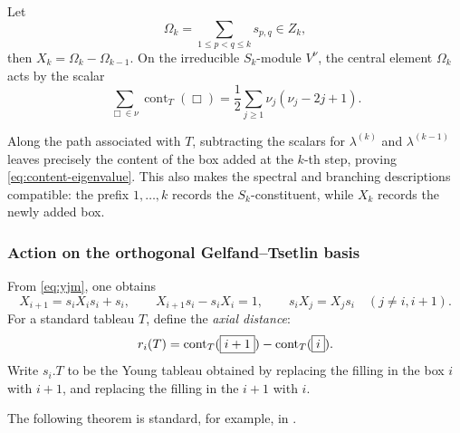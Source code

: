 \documentclass[11pt]{amsart}
\numberwithin{equation}{section}
\theoremstyle{definition}
\newcommand{\cont}{{\operatorname{cont}}}
\begin{document}
Let
\begin{equation*}
    \Omega_{k}=\sum_{1\leq p<q\leq k}s_{p,q}\in Z_{k},
\end{equation*}  
then $X_{k}=\Omega_{k}-\Omega_{k-1}$.  On the irreducible
$S_{k}$-module $V^\nu$, the central element $\Omega_{k}$ acts by the scalar
\begin{equation*}   \sum_{\Box\in\nu}\cont_{T}(\Box)
  =\frac12\sum_{j\geq1}\nu_j(\nu_j-2j+1).
\end{equation*}

Along the path associated with $T$, subtracting the scalars for
$\lambda^{(k)}$ and $\lambda^{(k-1)}$ leaves precisely the content of
the box added at the $k$-th step, proving
\eqref{eq:content-eigenvalue}.  This also makes the spectral and branching
descriptions compatible: the prefix $1,\ldots,k$ records the
$S_{k}$-constituent, while $X_{k}$ records the newly added box.

\subsubsection{Action on the orthogonal Gelfand--Tsetlin basis} \label{sss orthogonal gt basis}

From \eqref{eq:yjm}, one obtains
\begin{equation} 
  X_{i+1}=s_{i}X_{i} s_{i}+s_{i},
  \qquad
  X_{i+1}s_{i}-s_{i}X_{i}=1,
  \qquad
  s_{i}X_{j}=X_{j}s_{i}\quad(j\neq i,i+1).
  \label{eq:local-relations}
\end{equation}
For a standard tableau \(T\), define the \emph{axial distance}:
\begin{equation}
  r_{i}(T)=\textnormal{cont}_{T}(\boxed{i+1})-\textnormal{cont}_{T}(\boxed{i}).
  \label{eq:axial-distance}
\end{equation}
Write $s_{i}.T$ to be the Young tableau obtained by replacing the filling in the box \(\boxed{i} \) with \(\boxed{i+1}\), and replacing the filling in the \(\boxed{i+1}\) with \(\boxed{i}\).

The following theorem is standard, for example, in \cite{vershik2005new}. 
\end{document}
